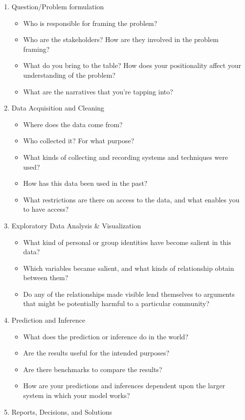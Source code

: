 \documentclass[
  letterpaper,
  DIV=11,
  numbers=noendperiod]{scrreprt}
\providecommand{\tightlist}{%
  \setlength{\itemsep}{0pt}\setlength{\parskip}{0pt}}\usepackage{longtable,booktabs,array}
\begin{document}
\begin{enumerate}
\def\labelenumi{\arabic{enumi}.}
\item
  Question/Problem formulation

  \begin{itemize}
  \tightlist
  \item
    Who is responsible for framing the problem?
  \item
    Who are the stakeholders? How are they involved in the problem
    framing?
  \item
    What do you bring to the table? How does your positionality affect
    your understanding of the problem?
  \item
    What are the narratives that you're tapping into?
  \end{itemize}
\item
  Data Acquisition and Cleaning

  \begin{itemize}
  \tightlist
  \item
    Where does the data come from?
  \item
    Who collected it? For what purpose?
  \item
    What kinds of collecting and recording systems and techniques were
    used?
  \item
    How has this data been used in the past?
  \item
    What restrictions are there on access to the data, and what enables
    you to have access?
  \end{itemize}
\item
  Exploratory Data Analysis \& Visualization

  \begin{itemize}
  \tightlist
  \item
    What kind of personal or group identities have become salient in
    this data?
  \item
    Which variables became salient, and what kinds of relationship
    obtain between them?
  \item
    Do any of the relationships made visible lend themselves to
    arguments that might be potentially harmful to a particular
    community?
  \end{itemize}
\item
  Prediction and Inference

  \begin{itemize}
  \tightlist
  \item
    What does the prediction or inference do in the world?
  \item
    Are the results useful for the intended purposes?
  \item
    Are there benchmarks to compare the results?
  \item
    How are your predictions and inferences dependent upon the larger
    system in which your model works?
  \end{itemize}
\item
  Reports, Decisions, and Solutions


\end{enumerate}
\end{document}
